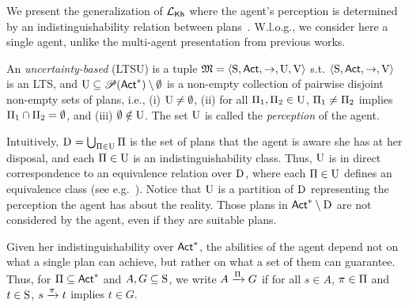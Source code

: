 We present the generalization of $\Khlogic$ where the agent's perception is determined by an indistinguishability relation between plans~\cite{AFSVQ21,AFSVQ23}. W.l.o.g., we consider here a single agent, unlike the multi-agent presentation from previous works.

An \emph{uncertainty-based \lts} (LTSU) is a tuple     $\model=\tup{\S,\Act,\ra,\Unc,\V}$ s.t. $\tup{\S,\Act,\ra,\V}$ is an LTS, and 
$\Unc\subseteq \powerset(\Act^*)\setminus \emptyset$ is a non-empty collection of pairwise disjoint non-empty sets of plans, i.e., (i) $\Unc\neq\emptyset$, (ii) for all $\plans_1,\plans_2\in\Unc$, $\plans_1\neq\plans_2$ implies  $\plans_1\cap\plans_2=\emptyset$, and (iii) $\emptyset\notin\Unc$. The set $\Unc$ is called the \emph{perception} of the agent. 


Intuitively, $\DS{} = \bigcup_{\plans \in \Unc} \plans$ is the set of plans that the  agent is aware she has at her disposal, and each $\plans \in \Unc$ is an indistinguishability class. Thus, $\Unc$ is in direct correspondence to an equivalence relation over $\DS{}$, where each $\plans\in\Unc$ defines an equivalence class (see e.g.~\cite{AFSVQ23}). 
%
Notice that $\Unc$ is a partition of $\DS{}$ representing the perception the agent has about the reality.  Those plans in $\Act^*\setminus\DS{}$ are not considered by the agent, even if they are suitable plans. 

Given her indistinguishability over $\Act^*$, the abilities of the agent depend not on what a single plan can achieve, but rather on what a set of them can guarantee. Thus, for $\plans \subseteq \Act^*$ and $A,G \subseteq \S$, we write $A\reach{\plans} G$ if for all $s\in A$, $\plan\in\plans$ and $t\in \S$,  $s \reach{\plan} t$ implies $t\in G$. 


